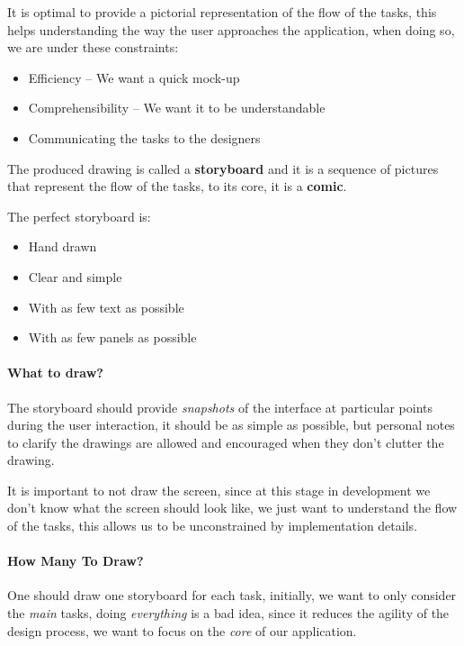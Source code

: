\documentclass[openright, twoside, twocolumn]{report}
\begin{document}
    It is optimal to provide a pictorial representation of the flow of the tasks, this helps
    understanding the way the user approaches the application, when doing so, we are under
    these constraints:

    \begin{itemize}
      \item Efficiency -- We want a quick mock-up
      \item Comprehensibility -- We want it to be understandable
      \item Communicating the tasks to the designers
    \end{itemize}

    The produced drawing is called a \textbf{storyboard} and it is a sequence of pictures
    that represent the flow of the tasks, to its core, it is a \textbf{comic}.

    The perfect storyboard is:

    \begin{itemize}
      \item Hand drawn
      \item Clear and simple
      \item With as few text as possible
      \item With as few panels as possible
    \end{itemize}

    \paragraph{What to draw?}
    The storyboard should provide \emph{snapshots} of the interface at particular points
    during the user interaction, it should be as simple as possible, but personal notes
    to clarify the drawings are allowed and encouraged when they don't clutter the drawing.

    It is important to not draw the screen, since at this stage in development we don't know
    what the screen should look like, we just want to understand the flow of the tasks, this
    allows us to be unconstrained by implementation details.

    \paragraph{How Many To Draw?}

    One should draw one storyboard for each task, initially, we want to only consider
    the \emph{main} tasks, doing \emph{everything} is a bad idea, since it reduces
    the agility of the design process, we want to focus on the \emph{core} of our application.
\end{document}

